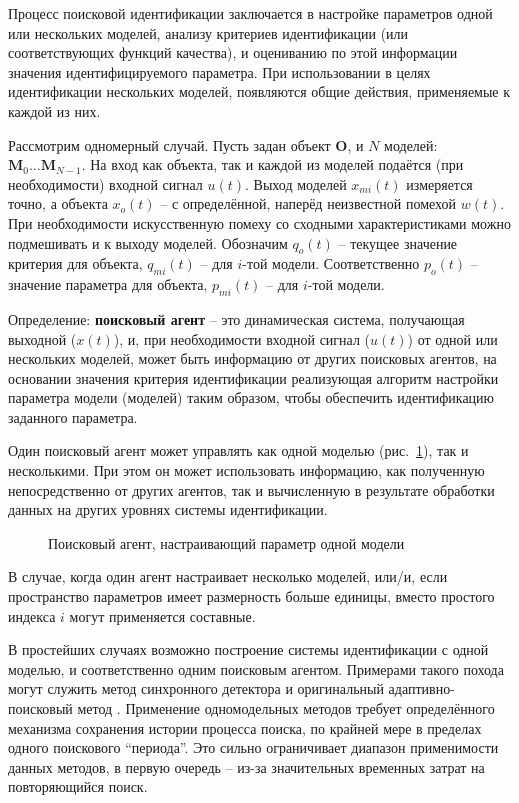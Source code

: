 \documentclass[a4paper,paratype,14pt,fouriernc]{dissatu}
\begin{document}
Процесс поисковой идентификации заключается в настройке параметров одной
или нескольких моделей, анализу критериев идентификации
(или соответствующих функций качества), и оцениванию по этой информации
значения идентифицируемого параметра. При использовании в целях идентификации нескольких моделей,
появляются общие действия, применяемые к каждой из них.

Рассмотрим одномерный случай.
Пусть задан объект $ \mathbf{O} $, и $N$ моделей:
$ \mathbf{M}_0 \ldots \mathbf{M}_{N-1} $.
На вход как объекта, так и каждой из моделей подаётся (при необходимости)
входной сигнал $u(t)$. Выход моделей $x_{mi}(t)$ измеряется точно,
а объекта $x_o(t)$ -- с определённой, наперёд неизвестной помехой $w(t)$. При необходимости искусственную помеху
со сходными характеристиками можно подмешивать и к выходу моделей.
Обозначим $q_o(t)$ -- текущее значение критерия для
объекта, $q_{mi}(t)$ -- для $i$-той модели.
Соответственно $p_o(t)$ -- значение параметра для объекта,
$p_{mi}(t)$ -- для $i$-той модели.


Определение: \textbf{поисковый агент} -- это динамическая система, получающая выходной ($x(t)$),
и, при необходимости входной сигнал ($u(t)$) от одной или нескольких моделей,
может быть информацию от других поисковых агентов,
на основании значения критерия идентификации
реализующая алгоритм настройки параметра модели (моделей)
таким образом, чтобы обеспечить идентификацию заданного параметра.

Один поисковый агент может управлять как одной моделью (рис.~\ref{atu:f:agent1}),
так и несколькими.
При этом он может использовать информацию,
как полученную непосредственно от других агентов,
так и вычисленную в результате обработки данных на других уровнях системы идентификации.

\begin{figure}[htb!]
\begin{center}

\end{center}
\caption{Поисковый агент, настраивающий параметр одной модели}
\label{atu:f:agent1}
\end{figure}


В случае, когда один агент настраивает несколько моделей,
или/и, если пространство параметров имеет размерность больше единицы,
вместо простого индекса $i$ могут применяется составные.

В простейших случаях возможно построение системы идентификации
с одной моделью, и соответственно одним поисковым агентом.
Примерами такого похода могут служить
метод синхронного детектора \cite{adopt_cont_sys}
и оригинальный адаптивно-поисковый метод \cite{mich_92}.
Применение одномодельных методов требует определённого механизма
сохранения истории процесса поиска, по крайней мере в пределах
одного поискового ``периода''. Это сильно ограничивает диапазон
применимости данных методов, в первую очередь -- из-за значительных
временных затрат на повторяющийся поиск.
\end{document}
